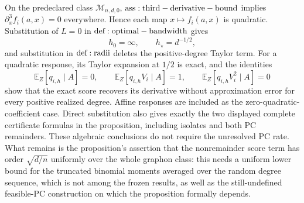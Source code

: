 On the predeclared class \(\mathcal M_{n,d,0}\), \({\rm ass:third-derivative-bound}\) implies \(\partial_x^3f_i(a,x)=0\) everywhere.  Hence each map \(x\mapsto f_i(a,x)\) is quadratic.  Substitution of \(L=0\) in \({\rm def:optimal-bandwidth}\) gives
\[
 h_0=\infty,\qquad h_\star=d^{-1/2},
\]
and substitution in \({\rm def:radii}\) deletes the positive-degree Taylor term.  For a quadratic response, its Taylor expansion at \(1/2\) is exact, and the identities
\[
 \mathbb E_Z[q_{i,h}\mid A]=0,
 \qquad
 \mathbb E_Z[q_{i,h}V_i\mid A]=1,
 \qquad
 \mathbb E_Z[q_{i,h}V_i^2\mid A]=0
\]
show that the exact score recovers its derivative without approximation error for every positive realized degree.  Affine responses are included as the zero-quadratic-coefficient case.  Direct substitution also gives exactly the two displayed complete certificate formulas in the proposition, including isolates and both PC remainders.  These algebraic conclusions do not require the unresolved PC rate.  What remains is the proposition's assertion that the nonremainder score term has order \(\sqrt{d/n}\) uniformly over the whole graphon class: this needs a uniform lower bound for the truncated binomial moments averaged over the random degree sequence, which is not among the frozen results, as well as the still-undefined feasible-PC construction on which the proposition formally depends.